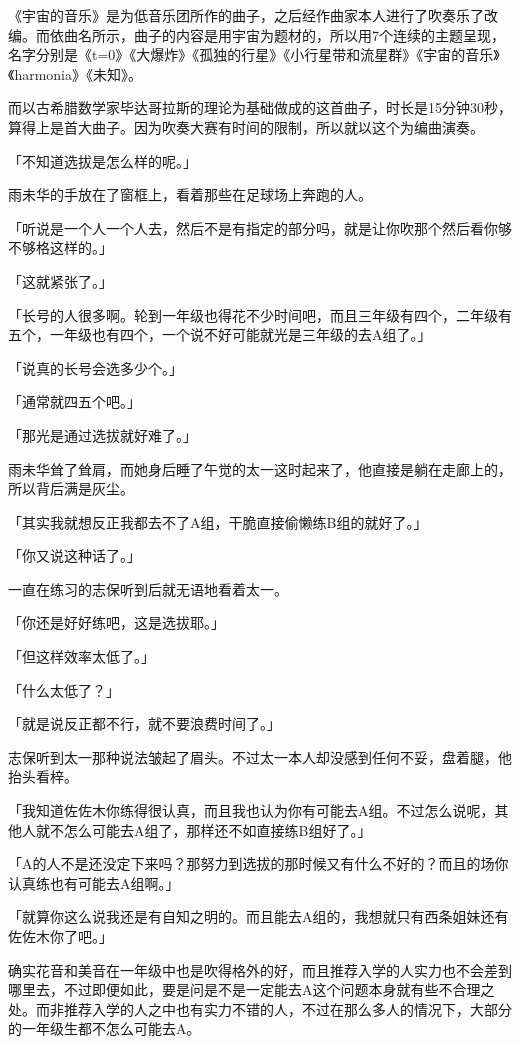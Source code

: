 \documentclass[UTF8]{ctexart}
\begin{document}
    《宇宙的音乐》是为低音乐团所作的曲子，之后经作曲家本人进行了吹奏乐了改编。而依曲名所示，曲子的内容是用宇宙为题材的，所以用7个连续的主题呈现，名字分别是《t=0》《大爆炸》《孤独的行星》《小行星带和流星群》《宇宙的音乐》《harmonia》《未知》。

    而以古希腊数学家毕达哥拉斯的理论为基础做成的这首曲子，时长是15分钟30秒，算得上是首大曲子。因为吹奏大赛有时间的限制，所以就以这个为编曲演奏。

    「不知道选拔是怎么样的呢。」

    雨未华的手放在了窗框上，看着那些在足球场上奔跑的人。

    「听说是一个人一个人去，然后不是有指定的部分吗，就是让你吹那个然后看你够不够格这样的。」

    「这就紧张了。」

    「长号的人很多啊。轮到一年级也得花不少时间吧，而且三年级有四个，二年级有五个，一年级也有四个，一个说不好可能就光是三年级的去A组了。」

    「说真的长号会选多少个。」

    「通常就四五个吧。」

    「那光是通过选拔就好难了。」

    雨未华耸了耸肩，而她身后睡了午觉的太一这时起来了，他直接是躺在走廊上的，所以背后满是灰尘。

    「其实我就想反正我都去不了A组，干脆直接偷懒练B组的就好了。」

    「你又说这种话了。」

    一直在练习的志保听到后就无语地看着太一。

    「你还是好好练吧，这是选拔耶。」

    「但这样效率太低了。」

    「什么太低了？」

    「就是说反正都不行，就不要浪费时间了。」

    志保听到太一那种说法皱起了眉头。不过太一本人却没感到任何不妥，盘着腿，他抬头看梓。

    「我知道佐佐木你练得很认真，而且我也认为你有可能去A组。不过怎么说呢，其他人就不怎么可能去A组了，那样还不如直接练B组好了。」

    「A的人不是还没定下来吗？那努力到选拔的那时候又有什么不好的？而且的场你认真练也有可能去A组啊。」

    「就算你这么说我还是有自知之明的。而且能去A组的，我想就只有西条姐妹还有佐佐木你了吧。」

    确实花音和美音在一年级中也是吹得格外的好，而且推荐入学的人实力也不会差到哪里去，不过即便如此，要是问是不是一定能去A这个问题本身就有些不合理之处。而非推荐入学的人之中也有实力不错的人，不过在那么多人的情况下，大部分的一年级生都不怎么可能去A。
\end{document}
